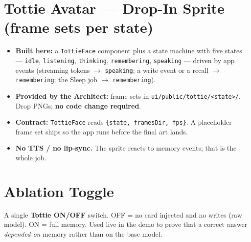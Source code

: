 \section{Tottie Avatar --- Drop-In Sprite (frame sets per state)}
\begin{itemize}
  \item \textbf{Built here:} a \texttt{TottieFace} component plus a state machine with five states
  --- \texttt{idle}, \texttt{listening}, \texttt{thinking}, \texttt{remembering}, \texttt{speaking}
  --- driven by app events (streaming tokens $\rightarrow$ \texttt{speaking}; a write event or a
  recall $\rightarrow$ \texttt{remembering}; the Sleep job $\rightarrow$ \texttt{remembering}).
  \item \textbf{Provided by the Architect:} frame sets in \texttt{ui/public/tottie/<state>/}. Drop
  PNGs; \textbf{no code change required}.
  \item \textbf{Contract:} \texttt{TottieFace} reads \texttt{\{state, framesDir, fps\}}. A
  placeholder frame set ships so the app runs before the final art lands.
  \item \textbf{No TTS / no lip-sync.} The sprite reacts to memory events; that is the whole job.
\end{itemize}

\section{Ablation Toggle}
A single \textbf{Tottie ON/OFF} switch. OFF = no card injected and no writes (raw model). ON = full
memory. Used live in the demo to prove that a correct answer \emph{depended on} memory rather than
on the base model.
